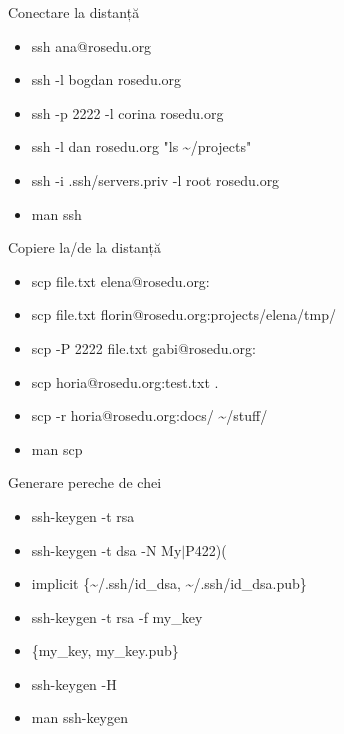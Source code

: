 \documentclass{beamer}
\begin{document}
\begin{frame}{Conectare la distanță}
  \begin{itemize}
    \item ssh ana@rosedu.org
    \item ssh -l bogdan rosedu.org
    \item ssh -p 2222 -l corina rosedu.org
    \item ssh -l dan rosedu.org "ls \~{}/projects"
    \item ssh -i .ssh/servers.priv -l root rosedu.org
    \item man ssh
  \end{itemize}
\end{frame}

\begin{frame}{Copiere la/de la distanță}
  \begin{itemize}
    \item scp file.txt elena@rosedu.org:
    \item scp file.txt florin@rosedu.org:projects/elena/tmp/
    \item scp -P 2222 file.txt gabi@rosedu.org:
    \item scp horia@rosedu.org:test.txt .
    \item scp -r horia@rosedu.org:docs/ \~{}/stuff/
    \item man scp
  \end{itemize}
\end{frame}

\begin{frame}{Generare pereche de chei}
  \begin{itemize}
    \item ssh-keygen -t rsa
    \item ssh-keygen -t dsa -N My$|$P422)(
    \item implicit \{\~{}/.ssh/id\_dsa, \~{}/.ssh/id\_dsa.pub\}
    \item ssh-keygen -t rsa -f my\_key
    \item \{my\_key, my\_key.pub\}
	\item ssh-keygen -H
    \item man ssh-keygen
  \end{itemize}
\end{frame}
\end{document}
